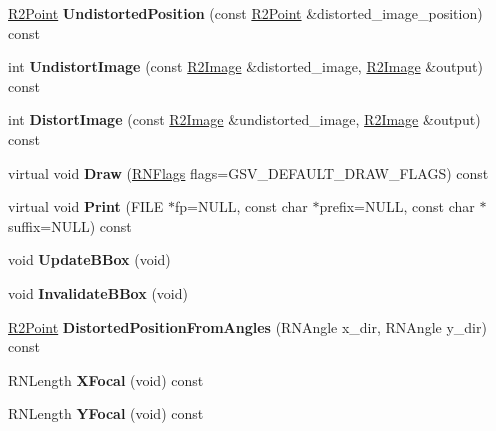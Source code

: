 \begin{DoxyCompactItemize}
\item 
\hyperlink{class_r2_point}{R2\+Point} {\bfseries Undistorted\+Position} (const \hyperlink{class_r2_point}{R2\+Point} \&distorted\+\_\+image\+\_\+position) const \hypertarget{class_g_s_v_camera_afe39ab353ea603b25d5281aa46b2aeda}{}\label{class_g_s_v_camera_afe39ab353ea603b25d5281aa46b2aeda}

\item 
int {\bfseries Undistort\+Image} (const \hyperlink{class_r2_image}{R2\+Image} \&distorted\+\_\+image, \hyperlink{class_r2_image}{R2\+Image} \&output) const \hypertarget{class_g_s_v_camera_a416e4e3916fbd6d3ccaaf5150f3392ea}{}\label{class_g_s_v_camera_a416e4e3916fbd6d3ccaaf5150f3392ea}

\item 
int {\bfseries Distort\+Image} (const \hyperlink{class_r2_image}{R2\+Image} \&undistorted\+\_\+image, \hyperlink{class_r2_image}{R2\+Image} \&output) const \hypertarget{class_g_s_v_camera_af32cefd6a72c6130e4132c9ba1656de3}{}\label{class_g_s_v_camera_af32cefd6a72c6130e4132c9ba1656de3}

\item 
virtual void {\bfseries Draw} (\hyperlink{class_r_n_flags}{R\+N\+Flags} flags=G\+S\+V\+\_\+\+D\+E\+F\+A\+U\+L\+T\+\_\+\+D\+R\+A\+W\+\_\+\+F\+L\+A\+GS) const \hypertarget{class_g_s_v_camera_affe023cc73f815f351d993f83f7b1b80}{}\label{class_g_s_v_camera_affe023cc73f815f351d993f83f7b1b80}

\item 
virtual void {\bfseries Print} (F\+I\+LE $\ast$fp=N\+U\+LL, const char $\ast$prefix=N\+U\+LL, const char $\ast$suffix=N\+U\+LL) const \hypertarget{class_g_s_v_camera_aef882dc5c58e781cd748264d6bc7778c}{}\label{class_g_s_v_camera_aef882dc5c58e781cd748264d6bc7778c}

\item 
void {\bfseries Update\+B\+Box} (void)\hypertarget{class_g_s_v_camera_a3ebdca4be19c7ac2a2d798e83f5242ed}{}\label{class_g_s_v_camera_a3ebdca4be19c7ac2a2d798e83f5242ed}

\item 
void {\bfseries Invalidate\+B\+Box} (void)\hypertarget{class_g_s_v_camera_ad5d307fa4b864ed40d0f6600f410c78f}{}\label{class_g_s_v_camera_ad5d307fa4b864ed40d0f6600f410c78f}

\item 
\hyperlink{class_r2_point}{R2\+Point} {\bfseries Distorted\+Position\+From\+Angles} (R\+N\+Angle x\+\_\+dir, R\+N\+Angle y\+\_\+dir) const \hypertarget{class_g_s_v_camera_ad0ecc1a30a782b0796035bb4a9d1b730}{}\label{class_g_s_v_camera_ad0ecc1a30a782b0796035bb4a9d1b730}

\item 
R\+N\+Length {\bfseries X\+Focal} (void) const \hypertarget{class_g_s_v_camera_a981dce267102eef615161cc9062a49d0}{}\label{class_g_s_v_camera_a981dce267102eef615161cc9062a49d0}

\item 
R\+N\+Length {\bfseries Y\+Focal} (void) const \hypertarget{class_g_s_v_camera_a549a144675f500b9e19e783c5e5756e5}{}\label{class_g_s_v_camera_a549a144675f500b9e19e783c5e5756e5}

\end{DoxyCompactItemize}
